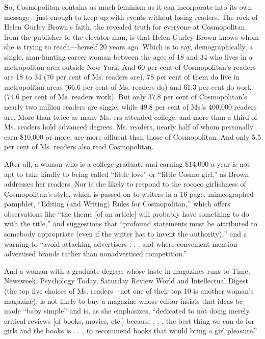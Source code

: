 \textbf{S}o, Cosmopolitan contains as much feminism as it can
incorporate into its own message---just enough to keep up with events
without losing readers. The rock of Helen Gurley Brown's faith, the
revealed truth for everyone at Cosmopolitan, from the publisher to the
elevator man, is that Helen Gurley Brown knows whom she is trying to
reach---herself 20 years ago. Which is to say, demographically, a
single, man‐hunting career woman between the ages of 18 and 34 who lives
in a metropolitan area outside New York. And 60 per cent of
Cosmopolitan's readers are 18 to 34 (70 per cent of Ms. readers are), 78
per cent of them do live in metropolitan areas (66.6 per cent of Ms.
readers do) and 61.3 per cent do work (74.6 per cent of Ms. readers
work). But only 37.8 per cent of Cosmopolitan's nearly two million
readers are single, while 49.8 per cent of Ms.'s 400,000 readers are.
More than twice as many Ms. ers attended college, and more than a third
of Ms. readers hold advanced degrees. Ms. readers, nearly half of whom
personally earn \$10,000 or more, are more affluent than those of
Cosmopolitan. And only 5.5 per cent of Ms. readers also read
Cosmopolitan.

After all, a woman who is a college graduate and earning \$14,000 a year
is not apt to take kindly to being called ``little love'' or ``little
Cosmo girl,'' as Brown addresses her readers. Nor is she likely to
respond to the rococo girlishness of Cosmopolitan's style, which is
passed on to writers in a 16‐page, mimeographed pamphlet, ``Editing (and
Writing) Rules for Cosmopolitan,'' which offers observations like ``the
theme {[}of an article{]} will probably have something to do with the
title,'' and suggestions that ``profound statements must be attributed
to somebody appropriate (even if the writer has to invent the
authority),'' and a warning to ``avoid attacking advertisers . . . and
where convenient mention advertised brands rather than nonadvertised
competition.''

And a woman with a graduate degree, whose taste in magazines runs to
Time, Newsweek, Psychology Today, Saturday Review World and Intellectual
Digest (the top five choices of Ms. readers---not one of their top 10 is
another woman's magazine), is not likely to buy a magazine whose editor
insists that ideas be made ``baby simple'' and is, as she emphasizes,
``dedicated to not doing merely critical reviews {[}of books, movies,
etc.{]} because . . . the best thing we can do for girls and the books
is . . . to recommend books that would bring a girl pleasure.''

